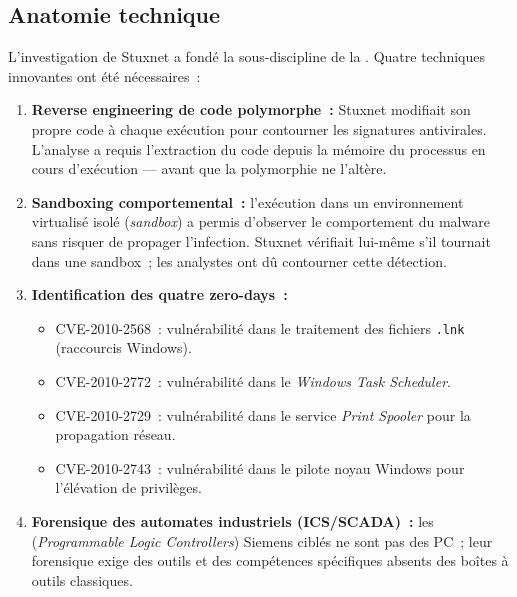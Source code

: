 \subsection{Anatomie technique}

L'investigation de Stuxnet a fondé la sous-discipline de la
.
Quatre techniques innovantes ont été nécessaires~:

\begin{enumerate}
    \item \textbf{Reverse engineering de code polymorphe~:} Stuxnet modifiait
          son propre code à chaque exécution pour contourner les signatures
          antivirales. L'analyse a requis l'extraction du code depuis la
          mémoire du processus en cours d'exécution --- avant que la
          polymorphie ne l'altère.

    \item \textbf{Sandboxing comportemental~:} l'exécution dans un
          environnement virtualisé isolé (\textit{sandbox}) a permis
          d'observer le comportement du malware sans risquer de propager
          l'infection. Stuxnet vérifiait lui-même s'il tournait dans une
          sandbox~; les analystes ont dû contourner cette détection.

    \item \textbf{Identification des quatre zero-days~:}
          \begin{itemize}
              \item CVE-2010-2568~: vulnérabilité dans le traitement des
                    fichiers \texttt{.lnk} (raccourcis Windows).
              \item CVE-2010-2772~: vulnérabilité dans le \textit{Windows
                    Task Scheduler}.
              \item CVE-2010-2729~: vulnérabilité dans le service
                    \textit{Print Spooler} pour la propagation réseau.
              \item CVE-2010-2743~: vulnérabilité dans le pilote
                    noyau Windows pour l'élévation de privilèges.
          \end{itemize}

    \item \textbf{Forensique des automates industriels (ICS/SCADA)~:}
          les  (\textit{Programmable Logic Controllers}) Siemens
          ciblés ne sont pas des PC~; leur forensique exige des outils et
          des compétences spécifiques absents des boîtes à outils classiques.
\end{enumerate}


